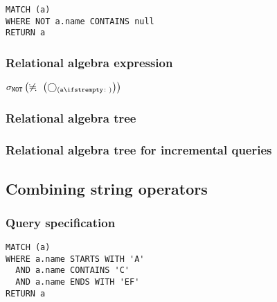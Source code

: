 \begin{lstlisting}
MATCH (a)
WHERE NOT a.name CONTAINS null
RETURN a
\end{lstlisting}

\subsubsection*{Relational algebra expression}

$\selection{\mathtt{NOT}} \left(\alldifferent{} \left(\getvertices{a}{}\right)\right)$

\subsubsection*{Relational algebra tree}


\subsubsection*{Relational algebra tree for incremental queries}


\subsection{Combining string operators}

\subsubsection*{Query specification}

\begin{lstlisting}
MATCH (a)
WHERE a.name STARTS WITH 'A'
  AND a.name CONTAINS 'C'
  AND a.name ENDS WITH 'EF'
RETURN a
\end{lstlisting}

